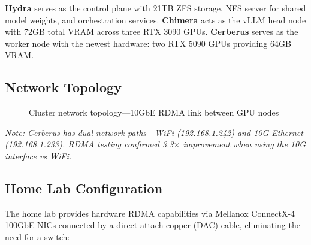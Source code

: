 \documentclass[10pt,letterpaper]{article}
\begin{document}
\textbf{Hydra} serves as the control plane with 21TB ZFS storage, NFS server for shared model weights, and orchestration services. \textbf{Chimera} acts as the vLLM head node with 72GB total VRAM across three RTX 3090 GPUs. \textbf{Cerberus} serves as the worker node with the newest hardware: two RTX 5090 GPUs providing 64GB VRAM.

\subsection{Network Topology}

\begin{figure}[H]
\centering
{}
\caption{Cluster network topology---10GbE RDMA link between GPU nodes}
\end{figure}

\textit{Note: Cerberus has dual network paths---WiFi (192.168.1.242) and 10G Ethernet (192.168.1.233). RDMA testing confirmed 3.3$\times$ improvement when using the 10G interface vs WiFi.}

\subsection{Home Lab Configuration}

The home lab provides hardware RDMA capabilities via Mellanox ConnectX-4 100GbE NICs connected by a direct-attach copper (DAC) cable, eliminating the need for a switch:
\end{document}
